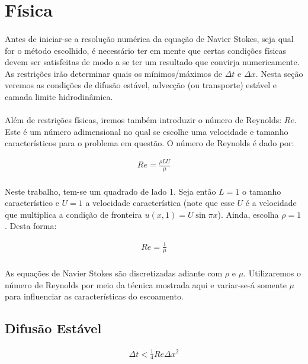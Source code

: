 \documentclass[fisica.tex]{subfiles}
\begin{document}
\section{Física}
\paragraph{} Antes de iniciar-se a resolução numérica da equação de Navier Stokes, seja qual for o método escolhido, é necessário ter em mente que certas condições físicas devem ser satisfeitas de modo a se ter um resultado que convirja numericamente. As restrições irão determinar quais os mínimos/máximos de $\Delta t$ e $\Delta x$. Nesta seção veremos as condições de difusão estável, advecção (ou transporte) estável e camada limite hidrodinâmica.

\paragraph{} Além de restrições físicas, iremos também introduzir o número de Reynolds: $\mathit{Re}$. Este é um número adimensional no qual se escolhe uma velocidade e tamanho característicos para o problema em questão. O número de Reynolds é dado por:

\begin{eqnarray}
\mathit{Re}=\frac{\rho L U}{\mu}
\end{eqnarray}

\paragraph{} Neste trabalho, tem-se um quadrado de lado 1. Seja então $L=1$ o tamanho característico e $U=1$ a velocidade característica (note que esse $U$ é a velocidade que multiplica a condição de fronteira $u(x,1)=U\sin{\pi x}$). Ainda, escolha $\rho = 1$. Desta forma:

\begin{eqnarray}
\mathit{Re}=\frac{1}{\mu}
\end{eqnarray}
 
\paragraph{} As equações de Navier Stokes são discretizadas adiante com $\rho$ e $\mu$. Utilizaremos o número de Reynolds por meio da técnica mostrada aqui e variar-se-á somente $\mu$ para influenciar as características do escoamento.

\subsection{Difusão Estável}
\begin{eqnarray}
\Delta t < \frac{1}{4}\mathit{Re}\Delta x^2
\end{eqnarray}
\end{document}
